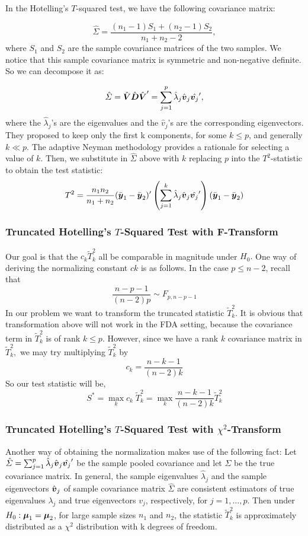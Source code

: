\documentclass[12pt]{article}
\newcommand{\bmu}{\mbox{\boldmath $\mu$}}
\newcommand{\by}{\mbox{\boldmath$y$}}
\newcommand{\bv}{\mbox{\boldmath$v$}}
\newcommand{\bV}{\mbox{\boldmath$V$}}
\newcommand{\bD}{\mbox{\boldmath$D$}}
\begin{document}
In the Hotelling's $T$-squared test, we have the following covariance matrix:

\[\hat{\Sigma} = \frac{ (n_1-1)S_1 + (n_2-1)S_2}{n_1+n_2-2},\]
where $S_1$ and $S_2$ are the sample covariance matrices of the two samples.
We notice that this sample covariance matrix is symmetric and non-negative definite. So we can decompose it as:

    \[\hat{\Sigma} = \hat{\bV} \hat{\bD} \hat{\bV}' = \sum_{j=1}^{p} \hat{\lambda}_j \hat{\bv}_j \hat{\bv_j}',\]
where the $\hat{\lambda}_j$'s are the eigenvalues and the $\hat{v}_j$'s are the corresponding eigenvectors.
They proposed to keep only the first k components, for some $k \le p$, and generally $k \ll p.$
The adaptive Neyman methodology provides a rationale for selecting a value of $k.$
Then, we substitute in $\hat{\Sigma}$ above with $k$ replacing $p$ into the $T^2$-statistic
to obtain the test statistic:
\[T^2 = \frac{n_1n_2}{n_1+n_2}(\bar{\by}_1 - \bar{\by}_2)'
\left(\sum_{j=1}^k \hat{\lambda}_j \hat{\bv}_j \hat{\bv_j}'\right) ( \bar{\by}_1 - \bar{\by}_2)\]


\subsubsection{Truncated Hotelling's $T$-Squared Test with F-Transform}
 Our goal is that the $c_k \tilde{T}_k^2 $ all be comparable in magnitude under $H_0.$
  One way of deriving the normalizing constant $ck$ is as follows. In the case $p \le n-2$, recall that
    \[\frac{n-p-1}{(n-2)p} \sim F_{p,n-p-1}\]
 In our problem we want to transform the truncated statistic $\tilde{T}_k^2$. It is obvious that
 transformation above will not work in the FDA setting, because the covariance term in
 $\tilde{T}_k^2$ is of rank $k \le p$. However, since we have a rank $k$ covariance matrix in $\tilde{T}_k^2,$
 we may try multiplying $\tilde{T}_k^2$ by
\[c_k = \frac{n-k-1}{(n-2)k}\]
 So our test statistic will be,
\[S^* = \underset{k}{\max} c_k \;\tilde{T}_k^2 = \underset{k}{\max} \frac{n-k-1}{(n-2)k} \tilde{T}_k^2\]

 \subsubsection{Truncated Hotelling's $T$-Squared Test with $\chi^2$-Transform}
 Another way of obtaining the normalization makes use of the following fact:
 Let $\hat{\Sigma} = \sum_{j=1}^{p} \hat{\lambda}_j \hat{\bv}_j \hat{\bv_j}'$ be
 the sample pooled covariance and let $ \Sigma $ be the true covariance matrix.
 In general, the sample eigenvalues $ \hat{\lambda}_j $ and the sample eigenvectors
 $\hat{\bv}_j$ of sample covariance matrix $\hat{\Sigma}$ are consistent estimators
 of true eigenvalues $ \lambda_j $ and true eigenvectors $v_j$, respectively, for
 $j = 1,\ldots,p.$ Then under $H_0 : \bmu_1 = \bmu_2$, for large sample sizes
 $n_1$ and $n_2$, the statistic $\tilde{T}_k^2$ is approximately distributed
 as a $\chi^2$ distribution with k degrees of freedom.
\end{document}

